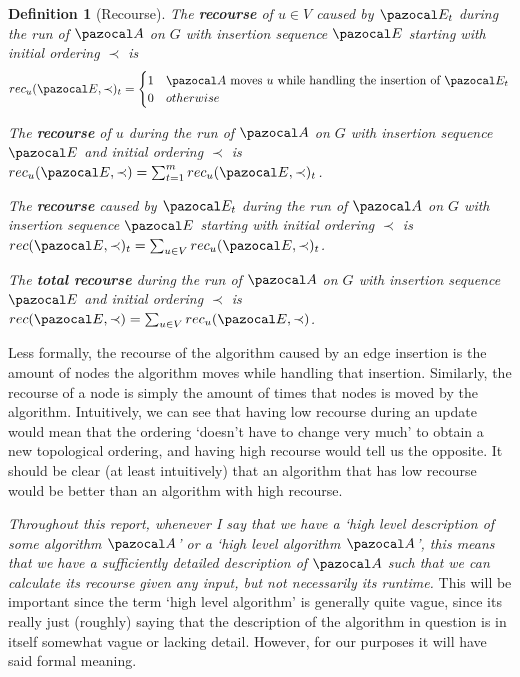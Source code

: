 \documentclass{report}
\newtheorem{definition}[theorem]{Definition}
\begin{document}
\begin{definition}[Recourse]
The \textbf{recourse} of $u \in V$ caused by $\pazocal E_t$ during the run of $\pazocal A$ on $G$ with insertion sequence $\pazocal E$ starting with initial ordering $\prec$ is
\[ rec_u(\pazocal E, \prec)_t = \begin{cases} 
      1 & \textnormal{$\pazocal A$ moves $u$ while handling the insertion of $\pazocal E_t$}\\
      0 & otherwise \\
   \end{cases}
\]

The \textbf{recourse} of $u$ during the run of $\pazocal A$ on $G$ with insertion sequence $\pazocal E$ and initial ordering $\prec$ is $rec_u(\pazocal E, \prec) = \sum_{t=1}^m  rec_u(\pazocal E, \prec)_t$.

The \textbf{recourse} caused by $\pazocal E_t$ during the run of $\pazocal A$ on $G$ with insertion sequence $\pazocal E$ starting with initial ordering $\prec$ is $rec(\pazocal E, \prec)_t = \sum_{u \in V} rec_u(\pazocal E, \prec)_t$.

The \textbf{total recourse} during the run of $\pazocal A$ on $G$ with insertion sequence $\pazocal E$ and initial ordering $\prec$ is $rec(\pazocal E, \prec) = \sum_{u \in V} rec_u(\pazocal E, \prec)$.
\end{definition}

Less formally, the recourse of the algorithm caused by an edge insertion is the amount of nodes the algorithm moves while handling that insertion. Similarly, the recourse of a node is simply the amount of times that nodes is moved by the algorithm. Intuitively, we can see that having low recourse during an update would mean that the ordering `doesn't have to change very much' to obtain a new topological ordering, and having high recourse would tell us the opposite. It should be clear (at least intuitively) that an algorithm that has low recourse would be better than an algorithm with high recourse.

\textit{Throughout this report, whenever I say that we have a `high level description of some algorithm $\pazocal A$' or a `high level algorithm $\pazocal A$', this means that we have a sufficiently detailed description of $\pazocal A$ such that we can calculate its recourse given any input, but not necessarily its runtime.} This will be important since the term `high level algorithm' is generally quite vague, since its really just (roughly) saying that the description of the algorithm in question is in itself somewhat vague or lacking detail. However, for our purposes it will have said formal meaning.
\end{document}
